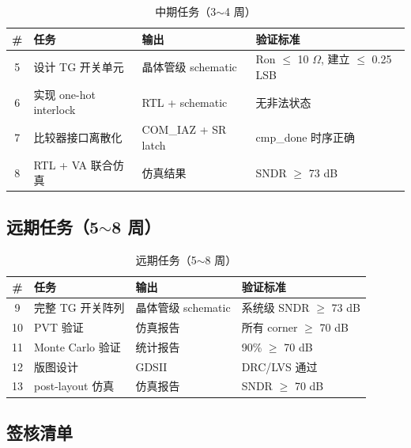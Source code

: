 \documentclass[UTF8,a4paper,11pt]{ctexart}
\providecommand{\textOmega}{\ensuremath{\Omega}}
\begin{document}
\begin{table}[H]
\centering
\caption{中期任务（3$\sim$4 周）}
\label{tab:mid-tasks}
\begin{tabular}{clll}
\toprule
\# & 任务 & 输出 & 验证标准 \\
\midrule
5 & 设计 TG 开关单元        & 晶体管级 schematic     & Ron $\leq$ 10 \textOmega, 建立 $\leq$ 0.25 LSB \\
6 & 实现 one-hot interlock  & RTL + schematic        & 无非法状态 \\
7 & 比较器接口离散化        & COM\_IAZ + SR latch    & cmp\_done 时序正确 \\
8 & RTL + VA 联合仿真       & 仿真结果               & SNDR $\geq$ 73 dB \\
\bottomrule
\end{tabular}
\end{table}

\subsection{远期任务（5$\sim$8 周）}

\begin{table}[H]
\centering
\caption{远期任务（5$\sim$8 周）}
\label{tab:far-tasks}
\begin{tabular}{clll}
\toprule
\# & 任务 & 输出 & 验证标准 \\
\midrule
9  & 完整 TG 开关阵列       & 晶体管级 schematic & 系统级 SNDR $\geq$ 73 dB \\
10 & PVT 验证               & 仿真报告           & 所有 corner $\geq$ 70 dB \\
11 & Monte Carlo 验证       & 统计报告           & 90\% $\geq$ 70 dB \\
12 & 版图设计               & GDSII              & DRC/LVS 通过 \\
13 & post-layout 仿真       & 仿真报告           & SNDR $\geq$ 70 dB \\
\bottomrule
\end{tabular}
\end{table}

\subsection{签核清单}
\end{document}
